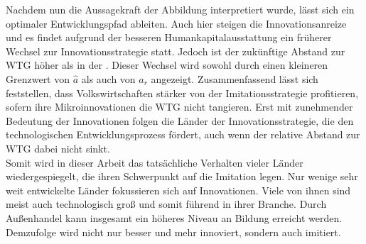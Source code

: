 Nachdem nun die Aussagekraft der Abbildung interpretiert wurde, lässt sich ein optimaler Entwicklungspfad ableiten. Auch hier steigen die Innovationsanreize und es findet aufgrund der besseren Humankapitalausstattung ein früherer Wechsel zur \textcolor[rgb]{0.74,0.97,0.22}{Innovationsstrategie} statt. Jedoch ist der zukünftige Abstand zur WTG höher als in der . Dieser Wechsel wird sowohl durch einen kleineren Grenzwert von $\hat{a}$ als auch von $a_r$ angezeigt.
\bigskip
%
Zusammenfassend lässt sich feststellen, dass Volkswirtschaften stärker von der Imitationsstrategie profitieren, sofern ihre Mikroinnovationen die WTG nicht tangieren. Erst mit zunehmender Bedeutung der Innovationen folgen die Länder der Innovationsstrategie, die den technologischen Entwicklungsprozess fördert, auch wenn der relative Abstand zur WTG dabei nicht sinkt. \\
%
Somit wird in dieser Arbeit das tatsächliche Verhalten vieler Länder wiedergespiegelt, die ihren Schwerpunkt auf die Imitation legen. Nur wenige sehr weit entwickelte Länder fokussieren sich auf Innovationen. Viele von ihnen sind meist auch technologisch groß und somit führend in ihrer Branche. Durch Außenhandel kann insgesamt ein höheres Niveau an Bildung erreicht werden. Demzufolge wird nicht nur besser und mehr innoviert, sondern auch imitiert.
